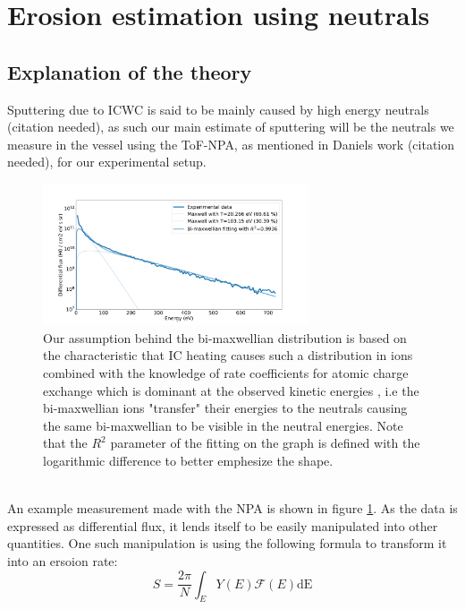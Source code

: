 \documentclass{article}
\begin{document}
\section{Erosion estimation using neutrals}
\subsection{Explanation of the theory}
Sputtering due to ICWC is said to be mainly caused by high energy neutrals (citation needed), as such 
our main estimate of sputtering will be the neutrals we measure in the vessel
using the ToF-NPA, as mentioned in Daniels work (citation needed), for our experimental setup.
\noindent
\begin{figure}[ht]
    \centering
    \includegraphics[width=0.7\textwidth]{figures/NPA_example.pdf}
    \caption{Our assumption behind the bi-maxwellian distribution is based on
        the characteristic that IC heating causes such a distribution in ions
        \cite{Bi-Maxwell} combined with the knowledge of rate coefficients for atomic charge
        exchange which is dominant at the observed kinetic energies \cite
        {McCRACKEN}, i.e the bi-maxwellian ions "transfer" their energies to the neutrals
        causing the same bi-maxwellian to be visible in the neutral energies.  
        Note that the $R^2$ parameter of the fitting on the graph
        is defined with the logarithmic difference to better emphesize the shape.}
    \label{fig:examplemeasurement}
\end{figure}\\
An example measurement made with the NPA is shown in figure
\ref{fig:examplemeasurement}. As the data is expressed as differential flux,
it lends itself to be easily manipulated into other quantities. One such manipulation
is using the following formula to transform it into an ersoion rate:
\begin{equation}
    S = \frac{2\pi}{N} \int_E Y(E)\mathcal{F} (E) \text{dE}
    \label{eqn:ErosionRateFormal}
\end{equation}
\end{document}
